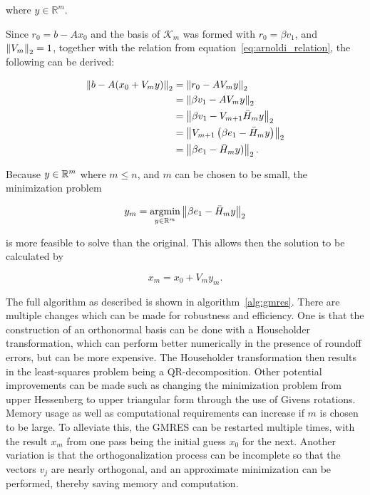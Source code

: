 where $y \in \mathbb{R}^m$.

Since $r_0 = b-A x_0$ and the basis of $\mathcal{K}_m$ was formed with $r_0 = \beta v_1$, and $\left\lVert V_m\right\rVert_2 = 1$, together with the relation from equation~\ref{eq:arnoldi_relation}, the following can be derived:

\begin{equation}
    \begin{aligned}
        \left\lVert b - A(x_0 + V_m y)\right\rVert_2 & = \left\lVert r_0 - A V_m y\right\rVert_2 \\
                                 & = \left\lVert\beta v_1 - A V_m y\right\rVert_2 \\
                                 & = \left\lVert\beta v_1 - V_{m+1}\bar{H}_m y\right\rVert_2 \\
                                 & = \left\lVert V_{m+1}\left(\beta e_1 - \bar{H}_m y \right)\right\rVert_2 \\
                                 & = \left\lVert\beta e_1 - \bar{H}_m y )\right\rVert_2.
    \end{aligned}
\end{equation}

Because $y \in \mathbb{R}^m$ where $m \leq n$, and $m$ can be chosen to be small, the minimization problem 

\begin{equation}
    y_m  = \operatorname*{argmin}_{y \in \mathbb{R}^m} \left\lVert\beta e_1 - \bar{H}_m y\right\rVert_2
\end{equation}

is more feasible to solve than the original. This allows then the solution to be calculated by

\begin{equation}
    x_m = x_0 + V_m y_m.
\end{equation}

The full algorithm as described is shown in algorithm~\ref{alg:gmres}. There are multiple changes which can be made for robustness and efficiency. One is that the construction of an orthonormal basis can be done with a Householder transformation, which can perform better numerically in the presence of roundoff errors, but can be more expensive. The Householder transformation then results in the least-squares problem being a QR-decomposition. Other potential improvements can be made such as changing the minimization problem from upper Hessenberg to upper triangular form through the use of Givens rotations. Memory usage as well as computational requirements can increase if $m$ is chosen to be large. To alleviate this, the GMRES can be restarted multiple times, with the result $x_m$ from one pass being the initial guess $x_0$ for the next. Another variation is that the orthogonalization process can be incomplete so that the vectors $v_j$ are nearly orthogonal, and an approximate minimization can be performed, thereby saving memory and computation.

